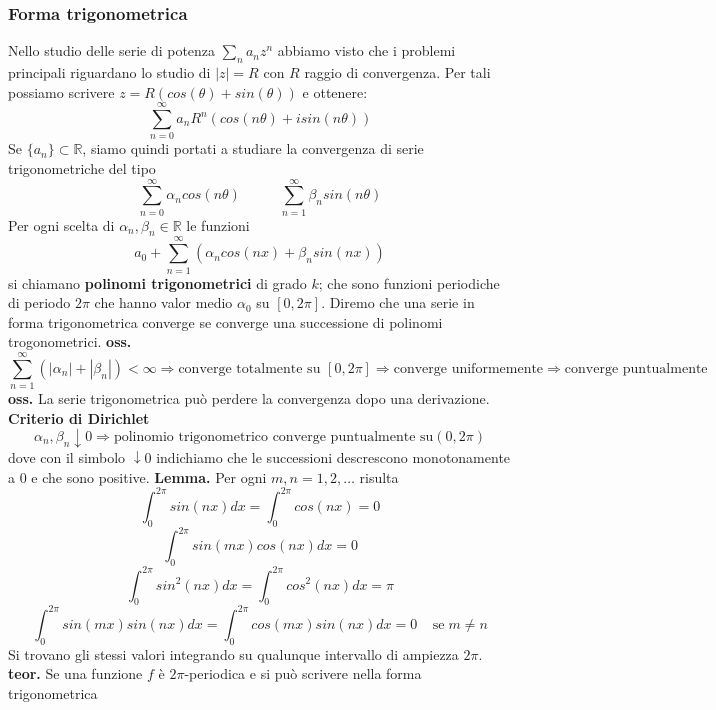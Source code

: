 \subsubsection{Forma trigonometrica}
Nello studio delle serie di potenza $\sum_{n}a_n z^n$ abbiamo visto che i problemi principali riguardano lo studio di $|z| = R$ con $R$ raggio di convergenza. Per tali possiamo scrivere $z = R(cos(\theta) + sin(\theta))$ e ottenere:
\[
    \sum_{n=0}^{\infty} a_n R^n(cos(n \theta) + isin(n \theta))
\]
Se $\{a_n\} \subset \mathbb{R}$, siamo quindi portati a studiare la convergenza di serie trigonometriche del tipo
\[
    \sum_{n=0}^{\infty} \alpha_n cos(n \theta) \;\;\;\;\; \;\;\;\;\; \sum_{n=1}^{\infty} \beta_n sin(n \theta)
\]
Per ogni scelta di $\alpha_n, \beta_n \in \mathbb{R}$ le funzioni
\[
    a_0 + \sum_{n=1}^{\infty} (\alpha_n cos(nx) + \beta_n sin(n x))
\]
si chiamano \textbf{polinomi trigonometrici} di grado $k$; che sono funzioni periodiche di periodo $2\pi$ che hanno valor medio $\alpha_0$ su $[0, 2\pi]$.\newline
Diremo che una serie in forma trigonometrica converge se converge una successione di polinomi trogonometrici.\newline
\textbf{oss.} 
\[
    \sum_{n=1}^{\infty} (|\alpha_n| + |\beta_n|) < \infty \Rightarrow \text{converge totalmente su } [0,2\pi] \Rightarrow \text{converge uniformemente} \Rightarrow \text{converge puntualmente}
\]
\textbf{oss.} La serie trigonometrica può perdere la convergenza dopo una derivazione.\newline
\newline
\textbf{Criterio di Dirichlet}
\[
    \alpha_n, \beta_n \downarrow 0 \Rightarrow \text{polinomio trigonometrico converge puntualmente su} (0,2\pi)
\]
dove con il simbolo $\downarrow 0$ indichiamo che le successioni descrescono monotonamente a $0$ e che sono positive.\newline
\newline
\textbf{Lemma.} Per ogni $m,n = 1,2,\dots$ risulta 
\[
    \int_{0}^{2\pi} sin(nx) dx = \int_{0}^{2\pi} cos(nx) = 0
\]
\[
    \int_{0}^{2\pi} sin(mx) cos(nx) dx = 0
\]
\[
    \int_{0}^{2\pi} sin^2(nx) dx = \int_{0}^{2\pi} cos^2(nx) dx = \pi
\]
\[
    \int_{0}^{2\pi} sin(mx) sin(nx) dx = \int_{0}^{2\pi} cos(mx) sin(nx) dx = 0 \;\;\;\; \text{se} \; m\neq n
\]
Si trovano gli stessi valori integrando su qualunque intervallo di ampiezza $2\pi$.\newline
\newline
\textbf{teor.} Se una funzione $f$ è $2\pi$-periodica e si può scrivere nella forma trigonometrica
